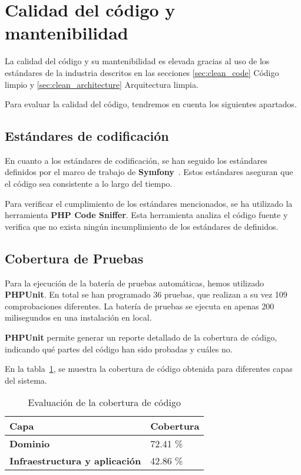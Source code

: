 \section{Calidad del código y mantenibilidad}

La calidad del código y su mantenibilidad es elevada gracias al uso de los estándares de la industria descritos en las
secciones \ref{sec:clean_code} Código limpio y \ref{sec:clean_architecture} Arquitectura limpia.

Para evaluar la calidad del código, tendremos en cuenta los siguientes apartados.

\subsection{Estándares de codificación}

En cuanto a los estándares de codificación, se han seguido los estándares definidos por el marco de trabajo de
\textbf{Symfony}~\cite{url_symfony_code_standards}.
Estos estándares aseguran que el código sea consistente a lo largo del tiempo.

Para verificar el cumplimiento de los estándares mencionados, se ha utilizado la herramienta \textbf{PHP Code Sniffer}.
Esta herramienta analiza el código fuente y verifica que no exista ningún incumplimiento de los estándares de
definidos.

\subsection{Cobertura de Pruebas}

Para la ejecución de la batería de pruebas automáticas, hemos utilizado \textbf{PHPUnit}.
En total se han programado 36 pruebas, que realizan a su vez 109 comprobaciones diferentes.
La batería de pruebas se ejecuta en apenas 200 milisegundos en una instalación en local.

\textbf{PHPUnit} permite generar un reporte detallado de la cobertura de código, indicando qué partes del código han
sido probadas y cuáles no.

En la tabla~\ref{tab:phpunit_report}, se muestra la cobertura de código obtenida para diferentes capas del sistema.

\begin{table}[h]
    \renewcommand{\arraystretch}{1.5}
    \setlength{\tabcolsep}{10pt}
    \begin{tabular}{>{\bfseries}p{} p{}}
        \toprule
        \textbf{Capa}                         & \textbf{Cobertura} \\
        \midrule
        \textbf{Dominio}                      & 72.41 \%           \\
        \textbf{Infraestructura y aplicación} & 42.86 \%           \\
        \bottomrule
    \end{tabular}
    \caption{Evaluación de la cobertura de código}
    \label{tab:phpunit_report}
\end{table}

